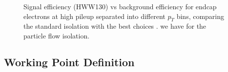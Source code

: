 \begin{figure}[!htbp]
\begin{center}
\caption{Signal efficiency (HWW130) vs background efficiency for endcap electrons at high pileup
separated into different $p_{T}$ bins, comparing the standard isolation with the best choices .
we have for the particle flow isolation.}
\label{fig:IsoPerformance_EleEndcap_BestChoices_HighPU}
\end{center}
\end{figure}

\clearpage


\subsection{Working Point Definition}


